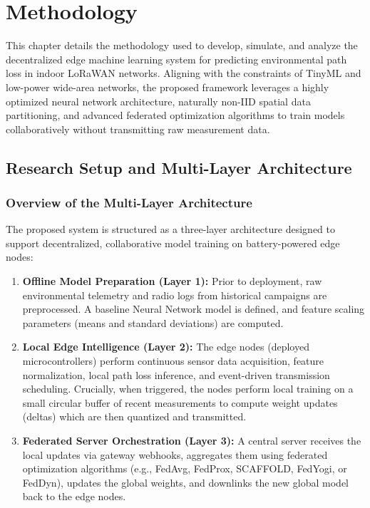 \chapter{Methodology}
\label{ch:methodology}

This chapter details the methodology used to develop, simulate, and analyze the decentralized edge machine learning system for predicting environmental path loss in indoor LoRaWAN networks. Aligning with the constraints of TinyML and low-power wide-area networks, the proposed framework leverages a highly optimized neural network architecture, naturally non-IID spatial data partitioning, and advanced federated optimization algorithms to train models collaboratively without transmitting raw measurement data.

\section{Research Setup and Multi-Layer Architecture}
\label{sec:research-setup}

\subsection{Overview of the Multi-Layer Architecture}
The proposed system is structured as a three-layer architecture designed to support decentralized, collaborative model training on battery-powered edge nodes:
\begin{enumerate}
    \item \textbf{Offline Model Preparation (Layer 1):} Prior to deployment, raw environmental telemetry and radio logs from historical campaigns are preprocessed. A baseline Neural Network model is defined, and feature scaling parameters (means and standard deviations) are computed.
    \item \textbf{Local Edge Intelligence (Layer 2):} The edge nodes (deployed microcontrollers) perform continuous sensor data acquisition, feature normalization, local path loss inference, and event-driven transmission scheduling. Crucially, when triggered, the nodes perform local training on a small circular buffer of recent measurements to compute weight updates (deltas) which are then quantized and transmitted.
    \item \textbf{Federated Server Orchestration (Layer 3):} A central server receives the local updates via gateway webhooks, aggregates them using federated optimization algorithms (e.g., FedAvg, FedProx, SCAFFOLD, FedYogi, or FedDyn), updates the global weights, and downlinks the new global model back to the edge nodes.
\end{enumerate}

